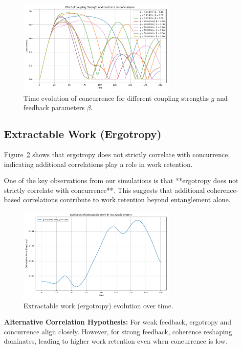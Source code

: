 \documentclass[a4paper,11pt]{article}
\begin{document}
\begin{figure}[h]
    \centering
    \includegraphics[width=0.7\textwidth]{Figure1.png}
    \caption{Time evolution of concurrence for different coupling strengths $g$ and feedback parameters $\beta$.}
    \label{fig:concurrence}
\end{figure}

\subsection{Extractable Work (Ergotropy)}
Figure~\ref{fig:ergotropy} shows that ergotropy does not strictly correlate with concurrence, indicating additional correlations play a role in work retention.

One of the key observations from our simulations is that **ergotropy does not strictly correlate with concurrence**. This suggests that additional coherence-based correlations contribute to work retention beyond entanglement alone.

\begin{figure}[h]
    \centering
    \includegraphics[width=0.7\textwidth]{Figure2.png}
    \caption{Extractable work (ergotropy) evolution over time.}
    \label{fig:ergotropy}
\end{figure}

\textbf{Alternative Correlation Hypothesis:}  
For weak feedback, ergotropy and concurrence align closely. However, for strong feedback, coherence reshaping dominates, leading to higher work retention even when concurrence is low.
\end{document}

